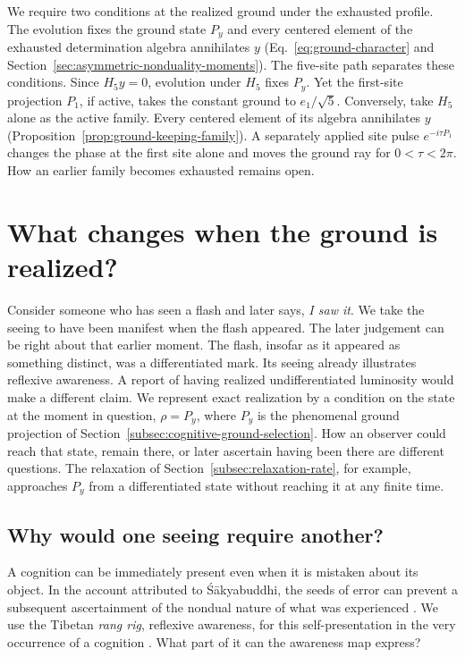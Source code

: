 \documentclass[11pt]{article}
\theoremstyle{definition}
\begin{document}
We require two conditions at the realized ground under the exhausted profile. The evolution fixes the ground state $P_y$ and every centered element of the exhausted determination algebra annihilates $y$ (Eq.~\eqref{eq:ground-character} and Section~\ref{sec:asymmetric-nonduality-moments}). The five-site path separates these conditions. Since $H_5y=0$, evolution under $H_5$ fixes $P_y$. Yet the first-site projection $P_1$, if active, takes the constant ground to $e_1/\sqrt5$. Conversely, take $H_5$ alone as the active family. Every centered element of its algebra annihilates $y$ (Proposition~\ref{prop:ground-keeping-family}). A separately applied site pulse $e^{-i\tau P_1}$ changes the phase at the first site alone and moves the ground ray for $0<\tau<2\pi$. How an earlier family becomes exhausted remains open.

\section{What changes when the ground is realized?}
\label{sec:realization-and-recognition}

Consider someone who has seen a flash and later says, \emph{I saw it}. We take the seeing to have been manifest when the flash appeared. The later judgement can be right about that earlier moment. The flash, insofar as it appeared as something distinct, was a differentiated mark. Its seeing already illustrates reflexive awareness. A report of having realized undifferentiated luminosity would make a different claim. We represent exact realization by a condition on the state at the moment in question, $\rho=P_y$, where $P_y$ is the phenomenal ground projection of Section~\ref{subsec:cognitive-ground-selection}. How an observer could reach that state, remain there, or later ascertain having been there are different questions. The relaxation of Section~\ref{subsec:relaxation-rate}, for example, approaches $P_y$ from a differentiated state without reaching it at any finite time.

\subsection{Why would one seeing require another?}
\label{subsec:realization-reflexivity}

A cognition can be immediately present even when it is mistaken about its object. In the account attributed to \'S\=akyabuddhi, the seeds of error can prevent a subsequent ascertainment of the nondual nature of what was experienced \cite[p.~425 n.~77]{Yiannopoulos2020}. We use the Tibetan \emph{rang rig}, reflexive awareness, for this self-presentation in the very occurrence of a cognition \cite[p.~31]{Yiannopoulos2020}. What part of it can the awareness map express?
\end{document}
